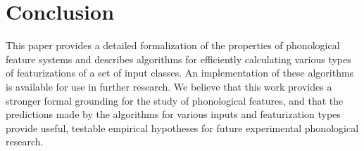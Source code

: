 \documentclass[11pt, oneside]{article}   	%
\begin{document}





\section{Conclusion}

This paper provides a detailed formalization of the properties of phonological feature systems and describes algorithms for efficiently calculating various types of featurizations of a set of input classes. An implementation of these algorithms is available for use in further research. We believe that this work provides a stronger formal grounding for the study of phonological features, and that the predictions made by the algorithms for various inputs and featurization types provide useful, testable empirical hypotheses for future experimental phonological research.
\end{document}
